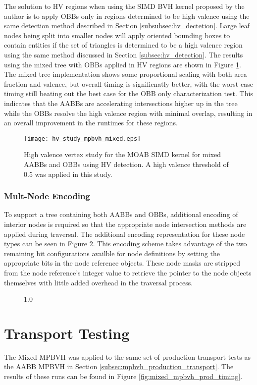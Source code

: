 The solution to HV regions when using the SIMD BVH kernel proposed by the author
is to apply OBBs only in regions determined to be high valence using the same
detection method described in Section \ref{subsubsec:hv_dectetion}. Large leaf
nodes being split into smaller nodes will apply oriented bounding boxes to
contain entities if the set of triangles is determined to be a high valence
region using the same method discussed in Section \ref{subsec:hv_detection}.
The results using the mixed tree with OBBs applied in HV regions are shown in
Figure \ref{fig:hv_study_mpbvh_mixed}. The mixed tree implementation shows some
proportional scaling with both area fraction and valence, but overall timing
is significnatly better, with the worst case timing still beating out the best
case for the OBB only characterization test. This indicates that the AABBs are
accelerating intersections higher up in the tree while the OBBs resolve the high
valence region with minimal overlap, resulting in an overall improvement in the
runtimes for these regions.

\begin{figure}
  \texttt{[image: hv\_study\_mpbvh\_mixed.eps]}
  \caption{High valence vertex study for the MOAB SIMD kernel for mixed AABBs
    and OBBs using HV detection. A high valence threshold of 0.5 was applied in
    this study.}
  \label{fig:hv_study_mpbvh_mixed}
\end{figure}

\subsubsection{Mult-Node Encoding}

To support a tree containing both AABBs and OBBs, additional encoding of
interior nodes is required so that the appropriate node intersection methods are
applied during traversal. The additional encoding representation for these node
types can be seen in Figure \ref{fig:mixed_node_encoding}. This encoding scheme
takes advantage of the two remaining bit configurations availble for node
definitions by setting the appropriate bits in the node reference objects. These
node masks are stripped from the node reference's integer value to retrieve the
pointer to the node objects themselves with little added overhead in the
traversal process.

\begin{figure}[H]
  {1.0\textwidth}
  \label{fig:mixed_node_encoding}
\end{figure}

\section{Transport Testing}

The Mixed MPBVH was applied to the same set of production transport tests as the
AABB MPBVH in Section \ref{subsec:mpbvh_production_transport}. The results of
these runs can be found in Figure \ref{fig:mixed_mpbvh_prod_timing}.






